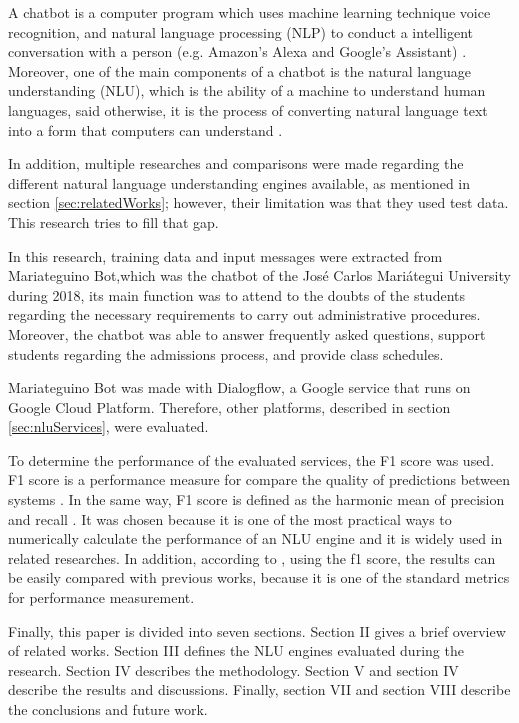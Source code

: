\documentclass[conference, letterpaper]{IEEEtran}
\begin{document}
A chatbot is a computer program which uses machine learning technique voice recognition, and natural language processing (NLP) to conduct a intelligent conversation with a person (e.g. Amazon's Alexa and Google's Assistant) \cite{mittal2019getting}. Moreover, one of the main components of a chatbot is the natural language understanding (NLU), which is the ability of a machine to understand human languages, said otherwise, it is the process of converting natural language text into a form that computers can understand \cite{pathak2017artificial}.

In addition, multiple researches and comparisons were made regarding the different natural language understanding engines available, as mentioned in section \ref{sec:relatedWorks}; however, their limitation was that they used test data. This research tries to fill that gap.

In this research, training data and input messages were extracted from Mariateguino Bot,which was the chatbot of the José Carlos Mariátegui University during 2018, its main function was to attend to the doubts of the students regarding the necessary requirements to carry out administrative procedures. Moreover, the chatbot was able to answer frequently asked questions, support students regarding the admissions process, and provide class schedules.


Mariateguino Bot was made with Dialogflow, a Google service that runs on Google Cloud Platform. Therefore, other platforms, described in section \ref{sec:nluServices}, were evaluated.

To determine the performance of the evaluated services, the F1 score was used. F1 score is a performance measure for compare the quality of predictions between systems \cite{Lipton2014}. In the same way, F1 score is defined as the harmonic mean of precision and recall \cite{campesato2020artificial}. It was chosen because it is one of the most practical ways to numerically calculate the performance of an NLU engine and it is widely used in related researches. In addition, according to \cite{arnicans2016databases}, using the f1 score, the results can be easily compared with previous works, because it is one of the standard metrics for performance measurement.

Finally, this paper is divided into seven sections. Section II gives a brief overview of related works. Section III defines the NLU engines evaluated during the research. Section IV describes the methodology. Section V and section IV describe the results and discussions. Finally, section VII and section VIII describe the conclusions and future work.
\end{document}
